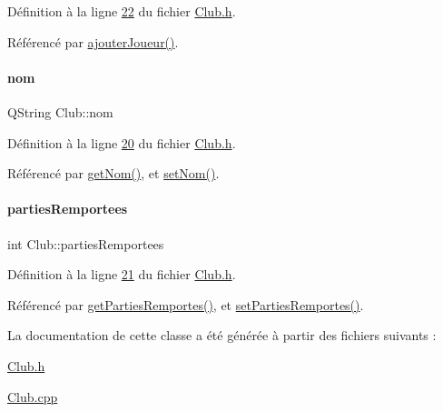 Définition à la ligne \hyperlink{_club_8h_source_l00022}{22} du fichier \hyperlink{_club_8h_source}{Club.\+h}.



Référencé par \hyperlink{_club_8cpp_source_l00043}{ajouter\+Joueur()}.

\mbox{\label{class_club_a18e1489d02110a82a0c8706f52091002}} 
\paragraph{\texorpdfstring{nom}{nom}}
{\footnotesize\ttfamily Q\+String Club\+::nom\hspace{0.3cm}{\ttfamily [private]}}



Définition à la ligne \hyperlink{_club_8h_source_l00020}{20} du fichier \hyperlink{_club_8h_source}{Club.\+h}.



Référencé par \hyperlink{_club_8cpp_source_l00023}{get\+Nom()}, et \hyperlink{_club_8cpp_source_l00028}{set\+Nom()}.

\mbox{\label{class_club_a1c5dd1362656cb4829de483255ffc39a}} 
\paragraph{\texorpdfstring{parties\+Remportees}{partiesRemportees}}
{\footnotesize\ttfamily int Club\+::parties\+Remportees\hspace{0.3cm}{\ttfamily [private]}}



Définition à la ligne \hyperlink{_club_8h_source_l00021}{21} du fichier \hyperlink{_club_8h_source}{Club.\+h}.



Référencé par \hyperlink{_club_8cpp_source_l00033}{get\+Parties\+Remportes()}, et \hyperlink{_club_8cpp_source_l00038}{set\+Parties\+Remportes()}.



La documentation de cette classe a été générée à partir des fichiers suivants \+:\begin{DoxyCompactItemize}
\item 
\hyperlink{_club_8h}{Club.\+h}\item 
\hyperlink{_club_8cpp}{Club.\+cpp}\end{DoxyCompactItemize}
